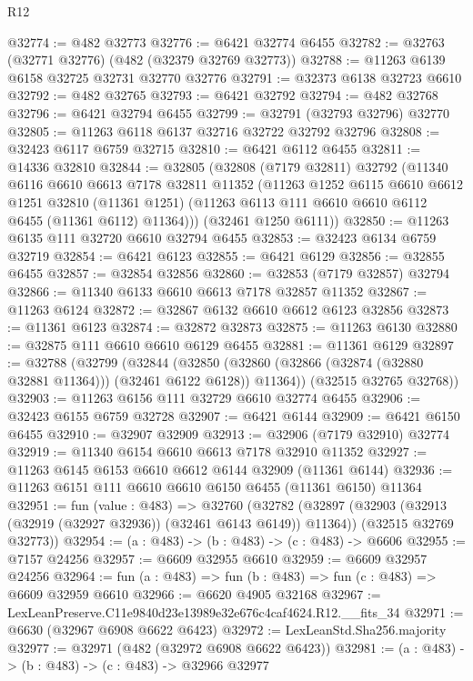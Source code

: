 \begin{lexlean}{R12}
\begin{coremodule}
@32774 := @482 @32773
@32776 := @6421 @32774 @6455
@32782 := @32763 (@32771 @32776) (@482 (@32379 @32769 @32773))
@32788 := @11263 @6139 @6158 @32725 @32731 @32770 @32776
@32791 := @32373 @6138 @32723 @6610
@32792 := @482 @32765
@32793 := @6421 @32792
@32794 := @482 @32768
@32796 := @6421 @32794 @6455
@32799 := @32791 (@32793 @32796) @32770
@32805 := @11263 @6118 @6137 @32716 @32722 @32792 @32796
@32808 := @32423 @6117 @6759 @32715
@32810 := @6421 @6112 @6455
@32811 := @14336 @32810
@32844 := @32805
    (@32808
      (@7179 @32811)
      @32792
      (@11340
        @6116
        @6610
        @6613
        @7178
        @32811
        @11352
        (@11263
          @1252
          @6115
          @6610
          @6612
          @1251
          @32810
          (@11361 @1251)
          (@11263 @6113 @111 @6610 @6610 @6112 @6455 (@11361 @6112) @11364)))
      (@32461 @1250 @6111))
@32850 := @11263 @6135 @111 @32720 @6610 @32794 @6455
@32853 := @32423 @6134 @6759 @32719
@32854 := @6421 @6123
@32855 := @6421 @6129
@32856 := @32855 @6455
@32857 := @32854 @32856
@32860 := @32853 (@7179 @32857) @32794
@32866 := @11340 @6133 @6610 @6613 @7178 @32857 @11352
@32867 := @11263 @6124
@32872 := @32867 @6132 @6610 @6612 @6123 @32856
@32873 := @11361 @6123
@32874 := @32872 @32873
@32875 := @11263 @6130
@32880 := @32875 @111 @6610 @6610 @6129 @6455
@32881 := @11361 @6129
@32897 := @32788
    (@32799
      (@32844
        (@32850 (@32860 (@32866 (@32874 (@32880 @32881 @11364))) (@32461 @6122 @6128)) @11364))
      (@32515 @32765 @32768))
@32903 := @11263 @6156 @111 @32729 @6610 @32774 @6455
@32906 := @32423 @6155 @6759 @32728
@32907 := @6421 @6144
@32909 := @6421 @6150 @6455
@32910 := @32907 @32909
@32913 := @32906 (@7179 @32910) @32774
@32919 := @11340 @6154 @6610 @6613 @7178 @32910 @11352
@32927 := @11263 @6145 @6153 @6610 @6612 @6144 @32909 (@11361 @6144)
@32936 := @11263 @6151 @111 @6610 @6610 @6150 @6455 (@11361 @6150) @11364
@32951 := fun (value : @483) =>
  @32760
    (@32782
      (@32897 (@32903 (@32913 (@32919 (@32927 @32936)) (@32461 @6143 @6149)) @11364))
      (@32515 @32769 @32773))
@32954 := (a : @483) -> (b : @483) -> (c : @483) -> @6606
@32955 := @7157 @24256
@32957 := @6609 @32955 @6610
@32959 := @6609 @32957 @24256
@32964 := fun (a : @483) => fun (b : @483) => fun (c : @483) => @6609 @32959 @6610
@32966 := @6620 @4905 @32168
@32967 := LexLeanPreserve.C11e9840d23e13989e32e676c4caf4624.R12.__fits_34
@32971 := @6630 (@32967 @6908 @6622 @6423)
@32972 := LexLeanStd.Sha256.majority
@32977 := @32971 (@482 (@32972 @6908 @6622 @6423))
@32981 := (a : @483) -> (b : @483) -> (c : @483) -> @32966 @32977

\end{coremodule}
\end{lexlean}
